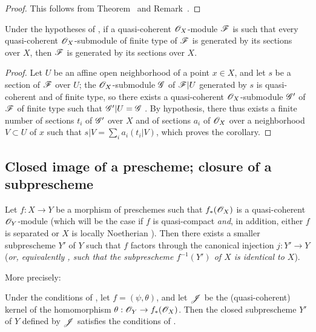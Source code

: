 \begin{proof}
\label{proof-1.9.4.9}
This follows from Theorem~ and Remark~.
\end{proof}

\begin{corollary}[9.4.10]
\label{1.9.4.10}
Under the hypotheses of , if a quasi-coherent $\mathscr{O}_X$-module $\mathscr{F}$ is
such that every quasi-coherent $\mathscr{O}_X$-submodule of finite type of $\mathscr{F}$ is generated by
its sections over $X$, then $\mathscr{F}$ is generated by its sections over $X$.
\end{corollary}

\begin{proof}
\label{proof-1.9.4.10}
Let $U$ be an affine open neighborhood of a point $x\in X$, and let $s$ be a
section of $\mathscr{F}$ over $U$; the $\mathscr{O}_X$-submodule $\mathscr{G}$ of $\mathscr{F}|U$ generated by $s$
is quasi-coherent and of finite type, so there exists a quasi-coherent $\mathscr{O}_X$-submodule
$\mathscr{G}'$ of $\mathscr{F}$ of finite type such that $\mathscr{G}'|U=\mathscr{G}$ . By
hypothesis, there thus exists a finite number of sections $t_i$ of $\mathscr{G}'$ over $X$ and of
sections $a_i$ of $\mathscr{O}_X$ over a neighborhood $V\subset U$ of $x$ such that
$s|V=\sum_i a_i(t_i|V)$, which proves the corollary.
\end{proof}

\subsection{Closed image of a prescheme; closure of a subprescheme}
\label{subsection:1.9.5}

\begin{proposition}[9.5.1]
\label{1.9.5.1}
Let $f:X\to Y$ be a morphism of preschemes such that $f_*(\mathscr{O}_X)$ is a quasi-coherent
$\mathscr{O}_Y$-module (which will be the case if $f$ is quasi-compact \emph{and}, in addition, either $f$ is separated or $X$ is locally Noetherian ). Then there exists a smaller
subprescheme $Y'$ of $Y$ such that $f$ factors through the canonical injection $j:Y'\to Y$
(\emph{or, equivalently , such that the subprescheme $f^{-1}(Y')$ of $X$ is
\emph{identical} to $X$}).
\end{proposition}

More precisely:
\begin{corollary}[9.5.2]
\label{1.9.5.2}
Under the conditions of , let $f=(\psi,\theta)$, and let $\mathscr{J}$ be the
(quasi-coherent) kernel of the homomorphism $\theta:\sh{O}_Y\to f_*(\sh{O}_X)$. Then the closed
subprescheme $Y'$ of $Y$ defined by $\mathscr{J}$ satisfies the conditions of .
\end{corollary}

